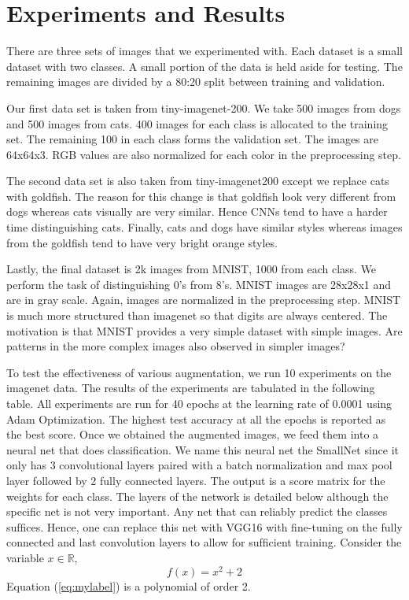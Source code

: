 \documentclass[a4paper,11pt]{article}
\begin{document}
\section{Experiments and Results}
There are three sets of images that we experimented with. Each dataset is a small dataset with two classes. A small portion of the data is held aside for testing. The remaining images are divided by a 80:20 split between training and validation.

Our ﬁrst data set is taken from tiny-imagenet-200. We take 500 images from dogs and 500 images from cats. 400 images for each class is allocated to the training set. The remaining 100 in each class forms the validation set. The images are 64x64x3. RGB values are also normalized for each color in the preprocessing step.

The second data set is also taken from tiny-imagenet200 except we replace cats with goldﬁsh. The reason for this change is that goldﬁsh look very different from dogs whereas cats visually are very similar. Hence CNNs tend to have a harder time distinguishing cats. Finally, cats and dogs have similar styles whereas images from the goldﬁsh tend to have very bright orange styles.

Lastly, the ﬁnal dataset is 2k images from MNIST, 1000 from each class. We perform the task of distinguishing 0’s from 8’s. MNIST images are 28x28x1 and are in gray scale. Again, images are normalized in the preprocessing step. MNIST is much more structured than imagenet so that digits are always centered. The motivation is that MNIST provides a very simple dataset with simple images. Are patterns in the more complex images also observed in simpler images?


To test the effectiveness of various augmentation, we run 10 experiments on the imagenet data. The results of the experiments are tabulated in the following table. All experiments are run for 40 epochs at the learning rate of 0.0001 using Adam Optimization. The highest test accuracy at all the epochs is reported as the best score. Once we obtained the augmented images, we feed them into a neural net that does classiﬁcation. We name this neural net the SmallNet since it only has 3 convolutional layers paired with a batch normalization and max pool layer followed by 2 fully connected layers. The output is a score matrix for the weights for each class. The layers of the network is detailed below although the speciﬁc net is not very important. Any net that can reliably predict the classes sufﬁces. Hence, one can replace this net with VGG16 with ﬁne-tuning on the fully connected and last convolution layers to allow for sufﬁcient training.
Consider the variable $x \in \mathbb{R}$, 
\begin{equation}
f(x)=x^2+2 \label{eq:mylabel}
\end{equation}
Equation (\ref{eq:mylabel}) is a polynomial of order 2.
\end{document}
